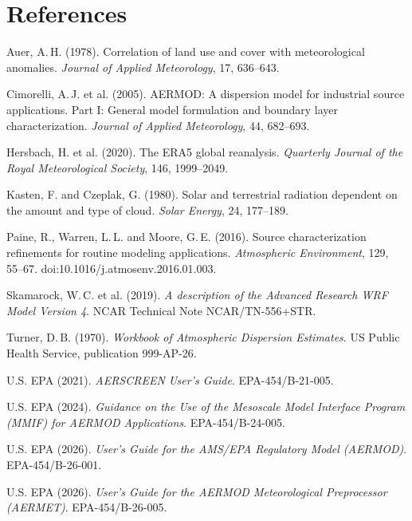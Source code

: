 \documentclass[11pt,a4paper]{article}
\begin{document}
\section*{References}
\small
\begin{description}[leftmargin=0pt,labelindent=0pt,itemsep=1pt,font=\normalfont]
\item Auer, A.\,H. (1978). Correlation of land use and cover with meteorological anomalies. \textit{Journal of
Applied Meteorology}, 17, 636–643.
\item Cimorelli, A.\,J. et al. (2005). AERMOD: A dispersion model for industrial source applications. Part I:
General model formulation and boundary layer characterization. \textit{Journal of Applied Meteorology}, 44, 682–693.
\item Hersbach, H. et al. (2020). The ERA5 global reanalysis. \textit{Quarterly Journal of the Royal Meteorological
Society}, 146, 1999–2049.
\item Kasten, F. and Czeplak, G. (1980). Solar and terrestrial radiation dependent on the amount and type of cloud.
\textit{Solar Energy}, 24, 177–189.
\item Paine, R., Warren, L.\,L. and Moore, G.\,E. (2016). Source characterization refinements for routine modeling
applications. \textit{Atmospheric Environment}, 129, 55–67. doi:10.1016/j.atmosenv.2016.01.003.
\item Skamarock, W.\,C. et al. (2019). \textit{A description of the Advanced Research WRF Model Version 4}. NCAR
Technical Note NCAR/TN-556+STR.
\item Turner, D.\,B. (1970). \textit{Workbook of Atmospheric Dispersion Estimates}. US Public Health Service,
publication 999-AP-26.
\item U.S. EPA (2021). \textit{AERSCREEN User's Guide}. EPA-454/B-21-005.
\item U.S. EPA (2024). \textit{Guidance on the Use of the Mesoscale Model Interface Program (MMIF) for AERMOD
Applications}. EPA-454/B-24-005.
\item U.S. EPA (2026). \textit{User's Guide for the AMS/EPA Regulatory Model (AERMOD)}. EPA-454/B-26-001.
\item U.S. EPA (2026). \textit{User's Guide for the AERMOD Meteorological Preprocessor (AERMET)}. EPA-454/B-26-005.
\end{description}
\end{document}
